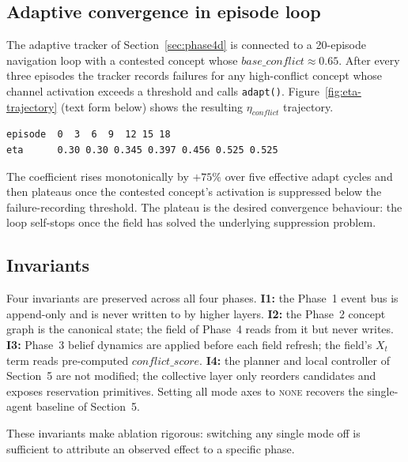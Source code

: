 \subsection{Adaptive convergence in episode loop}
\label{sec:collective-adaptive-loop}

The adaptive tracker of Section~\ref{sec:phase4d} is connected to a
20-episode navigation loop with a contested concept whose
$base\_conflict\approx 0.65$.  After every three episodes the tracker
records failures for any high-conflict concept whose channel activation
exceeds a threshold and calls \texttt{adapt()}.
Figure~\ref{fig:eta-trajectory} (text form below) shows the resulting
$\eta_{conflict}$ trajectory.

\begin{verbatim}
episode  0  3  6  9  12 15 18
eta      0.30 0.30 0.345 0.397 0.456 0.525 0.525
\end{verbatim}

The coefficient rises monotonically by $+75\%$ over five effective
adapt cycles and then plateaus once the contested concept's activation
is suppressed below the failure-recording threshold.  The plateau is
the desired convergence behaviour: the loop self-stops once the field
has solved the underlying suppression problem.

\subsection{Invariants}

Four invariants are preserved across all four phases.
\textbf{I1:} the Phase~1 event bus is append-only and is never written
to by higher layers.
\textbf{I2:} the Phase~2 concept graph is the canonical state; the field
of Phase~4 reads from it but never writes.
\textbf{I3:} Phase~3 belief dynamics are applied before each field
refresh; the field's $X_t$ term reads pre-computed
$conflict\_score$.
\textbf{I4:} the planner and local controller of Section~5 are not
modified; the collective layer only reorders candidates and exposes
reservation primitives.  Setting all mode axes to \textsc{none}
recovers the single-agent baseline of Section~5.

These invariants make ablation rigorous: switching any single mode off
is sufficient to attribute an observed effect to a specific phase.
